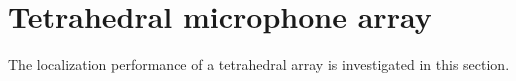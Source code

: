 \section{Tetrahedral microphone array}
The localization performance of a tetrahedral array is investigated in this section. 
